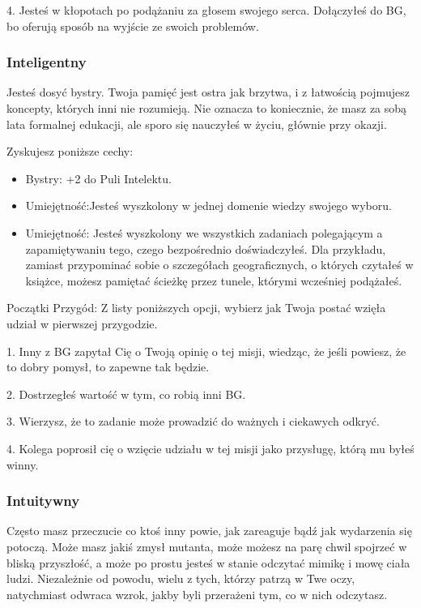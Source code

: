 4. Jesteś w kłopotach po podążaniu za głosem swojego serca. Dołączyłeś do BG, bo oferują sposób na wyjście ze swoich problemów.

\subsubsection{Inteligentny}

Jesteś dosyć bystry. Twoja pamięć jest ostra jak brzytwa, i z łatwością pojmujesz koncepty, których inni nie rozumieją. Nie oznacza to koniecznie, że masz za sobą lata formalnej edukacji, ale sporo się nauczyłeś w życiu, głównie przy okazji.

Zyskujesz poniższe cechy:
\begin{itemize}
\item Bystry: +2 do Puli Intelektu.
\item Umiejętność:Jesteś wyszkolony w jednej domenie wiedzy swojego wyboru.
\item Umiejętność: Jesteś wyszkolony we wszystkich zadaniach polegającym a zapamiętywaniu tego, czego bezpośrednio doświadczyłeś. Dla przykładu, zamiast przypominać sobie o szczegółach geograficznych, o których czytałeś w książce, możesz pamiętać ścieżkę przez tunele, którymi wcześniej podążałeś.
\end{itemize}

Początki Przygód: Z listy poniższych opcji, wybierz jak Twoja postać wzięła udział w pierwszej przygodzie.

1. Inny z BG zapytał Cię o Twoją opinię o tej misji, wiedząc, że jeśli powiesz, że to dobry pomysł, to zapewne tak będzie.

2. Dostrzegłeś wartość w tym, co robią inni BG.

3. Wierzysz, że to zadanie może prowadzić do ważnych i ciekawych odkryć.

4. Kolega poprosił cię o wzięcie udziału w tej misji jako przysługę, którą mu byłeś winny.

\subsubsection{Intuitywny}

Często masz przeczucie co ktoś inny powie, jak zareaguje bądź jak wydarzenia się potoczą. Może masz jakiś zmysł mutanta, może możesz na parę chwil spojrzeć w bliską przyszłość, a może po prostu jesteś w stanie odczytać mimikę i mowę ciała ludzi. Niezależnie od powodu, wielu z tych, którzy patrzą w Twe oczy, natychmiast odwraca wzrok, jakby byli przerażeni tym, co w nich odczytasz.

